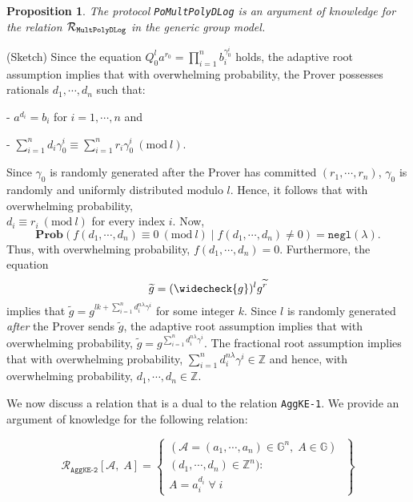 \documentclass[11pt, lettersize, notitlepage, leqno, footskip=0.6cm]{article}
\newcommand{\bz}{\mathbb Z}
\newcommand{\pl}{\prod\limits}
\newcommand{\slim}{\sum\limits}
\newcommand{\ttt}{\texttt}
\newcommand{\negl}{\ttt{{negl}}}
\newcommand{\wti}{\widetilde}
\newcommand{\mc}{\mathcal}
\newcommand{\mb}{\mathbb}
\newcommand{\mbf}{\mathbf}
\newcommand{\lam}{\lambda}
\newcommand{\weck}{\widecheck}
\newcommand{\Prob}{\mbf{Prob}}
\newcommand{\vs}{\vspace{-0.15cm}}
\newcommand{\noin}{\noindent}
\newcommand{\op}{overwhelming probability}
\newcommand{\Mod}[1]{\ (\mathrm{mod}\ #1)}
\newtheorem{Prop}[Thm]{Proposition}
\numberwithin{equation}{section}
\begin{document}
\begin{Prop} The protocol \verb|PoMultPolyDLog| is an argument of knowledge for the relation $\mc{R}_{{\tt{MultPolyDLog}}}$ in the generic group model.\end{Prop}

\begin{prf} (Sketch) Since the equation $Q_0^l a^{r_0} = \pl_{i=1}^n b_i^{\gamma_0^i}$ holds, the adaptive root assumption implies that with \op, the Prover possesses rationals $d_1,\cdots,d_n$ such that: 

\noin - $a^{d_i} = b_i$ for $i=1,\cdots,n$ and 

\noin - $\sum\limits_{i=1}^n d_i\gamma_0^i\equiv \sum\limits_{i=1}^n r_i\gamma_0^i\Mod{l}.$ 

Since $\gamma_0$ is randomly generated after the Prover has committed $(r_1,\cdots,r_n)$, $\gamma_0$ is randomly and uniformly distributed modulo $l$. Hence, it follows that with \op,\\ $d_i\equiv r_i\Mod{l}$ for every index $i$. Now, \vs $$\Prob\left(f(d_1,\cdots,d_n)\equiv 0\Mod{l} \;\Big|\; f(d_1,\cdots,d_n)\neq 0 \right) = \negl(\lam) .$$ Thus, with \op, $f(d_1,\cdots,d_n) = 0$. Furthermore, the equation \vs $$\wti{g} = (\weck{g})^lg^{\wti{r}} $$ implies that $\wti{g} = g^{lk+\sum\limits_{i=1}^n d_i^{n\lam}\gamma^i}$ for some integer $k$. Since $l$ is randomly generated \textit{after} the Prover sends $\wti{g}$, the adaptive root assumption implies that with \op, $\wti{g} = g^{\slim_{i=1}^n d_i^{n\lam}\gamma^i}$. The fractional root assumption implies that with \op, $\slim_{i=1}^n d_i^{n\lam}\gamma^i\in \bz$ and hence, with \op, $d_1,\cdots,d_n\in\bz$.\end{prf} 


\noindent We now discuss a relation that is a dual to the relation \verb|AggKE-1|. We provide an argument of knowledge for the following relation: 

\[
  \mc{R}_{{\ttt{AggKE-2}}}[\mc{A},\;A] = \left\{\begin{array}{l}
    (\mc{A} = (a_1,\cdots, a_n)\in \mb{G}^n,\; A\in\mb{G})\;\\ 
    (d_1,\cdots,d_n)\in\bz^n) :  \\
     A = a_i^{d_i}\;\forall\; i
  \end{array}\right\}
\]
\vspace{0.1cm}
\end{document}

